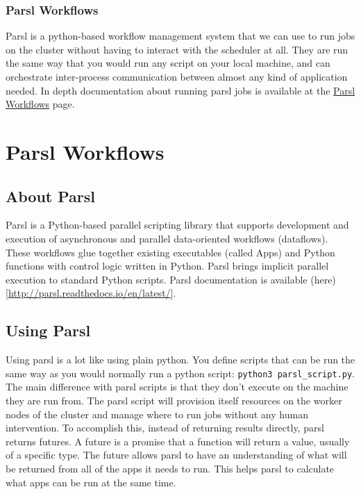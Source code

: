 \documentclass[]{book}
\begin{document}
\subsection{Parsl Workflows}\label{parsl-workflows}

Parsl is a python-based workflow management system that we can use to
run jobs on the cluster without having to interact with the scheduler at
all. They are run the same way that you would run any script on your
local machine, and can orchestrate inter-process communication between
almost any kind of application needed. In depth documentation about
running parsl jobs is available at the \href{link}{Parsl Workflows}
page.

\chapter{Parsl Workflows}\label{parsl-workflows-1}

\section{About Parsl}\label{about-parsl}

Parsl is a Python-based parallel scripting library that supports
development and execution of asynchronous and parallel data-oriented
workflows (dataflows). These workflows glue together existing
executables (called Apps) and Python functions with control logic
written in Python. Parsl brings implicit parallel execution to standard
Python scripts. Parsl documentation is available
(here){[}\url{http://parsl.readthedocs.io/en/latest/}{]}.

\section{Using Parsl}\label{using-parsl}

Using parsl is a lot like using plain python. You define scripts that
can be run the same way as you would normally run a python script:
\texttt{python3\ parsl\_script.py}. The main difference with parsl
scripts is that they don't execute on the machine they are run from. The
parsl script will provision itself resources on the worker nodes of the
cluster and manage where to run jobs without any human intervention. To
accomplish this, instead of returning results directly, parsl returns
futures. A future is a promise that a function will return a value,
usually of a specific type. The future allows parsl to have an
understanding of what will be returned from all of the apps it needs to
run. This helps parsl to calculate what apps can be run at the same
time.
\end{document}

